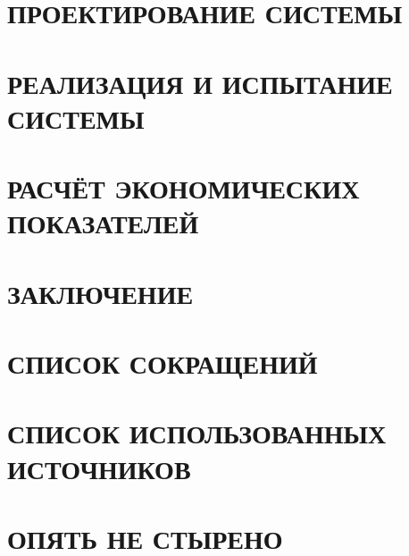 \newpage
\section{ПРОЕКТИРОВАНИЕ СИСТЕМЫ}






\newpage
\section{РЕАЛИЗАЦИЯ И ИСПЫТАНИЕ СИСТЕМЫ}



\newpage
\section{РАСЧЁТ ЭКОНОМИЧЕСКИХ ПОКАЗАТЕЛЕЙ}


\newpage
{}
{}
\section*{ЗАКЛЮЧЕНИЕ}


\newpage
{}
{}
\section*{СПИСОК СОКРАЩЕНИЙ}


\newpage
{}
{}
\section*{СПИСОК ИСПОЛЬЗОВАННЫХ ИСТОЧНИКОВ}


{}
\section*{ОПЯТЬ НЕ СТЫРЕНО}

